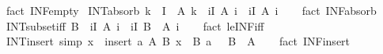 \begin{isabellebody}
\ {\isacharparenleft}{\kern0pt}fact\ INF{\isacharunderscore}{\kern0pt}empty{\isacharparenright}{\kern0pt}%
\endisatagproof
{\isafoldproof}%
%
\isadelimproof
\isanewline
%
\endisadelimproof
\isanewline
{}\isamarkupfalse%
\ INT{\isacharunderscore}{\kern0pt}absorb{\isacharcolon}{\kern0pt}\ {\isachardoublequoteopen}k\ {\isasymin}\ I\ {\isasymLongrightarrow}\ A\ k\ {\isasyminter}\ {\isacharparenleft}{\kern0pt}{\isasymInter}i{\isasymin}I{\isachardot}{\kern0pt}\ A\ i{\isacharparenright}{\kern0pt}\ {\isacharequal}{\kern0pt}\ {\isacharparenleft}{\kern0pt}{\isasymInter}i{\isasymin}I{\isachardot}{\kern0pt}\ A\ i{\isacharparenright}{\kern0pt}{\isachardoublequoteclose}\isanewline
%
\isadelimproof
\ \ %
\endisadelimproof
%
\isatagproof
{}\isamarkupfalse%
\ {\isacharparenleft}{\kern0pt}fact\ INF{\isacharunderscore}{\kern0pt}absorb{\isacharparenright}{\kern0pt}%
\endisatagproof
{\isafoldproof}%
%
\isadelimproof
\isanewline
%
\endisadelimproof
\isanewline
{}\isamarkupfalse%
\ INT{\isacharunderscore}{\kern0pt}subset{\isacharunderscore}{\kern0pt}iff{\isacharcolon}{\kern0pt}\ {\isachardoublequoteopen}B\ {\isasymsubseteq}\ {\isacharparenleft}{\kern0pt}{\isasymInter}i{\isasymin}I{\isachardot}{\kern0pt}\ A\ i{\isacharparenright}{\kern0pt}\ {\isasymlongleftrightarrow}\ {\isacharparenleft}{\kern0pt}{\isasymforall}i{\isasymin}I{\isachardot}{\kern0pt}\ B\ {\isasymsubseteq}\ A\ i{\isacharparenright}{\kern0pt}{\isachardoublequoteclose}\isanewline
%
\isadelimproof
\ \ %
\endisadelimproof
%
\isatagproof
{}\isamarkupfalse%
\ {\isacharparenleft}{\kern0pt}fact\ le{\isacharunderscore}{\kern0pt}INF{\isacharunderscore}{\kern0pt}iff{\isacharparenright}{\kern0pt}%
\endisatagproof
{\isafoldproof}%
%
\isadelimproof
\isanewline
%
\endisadelimproof
\isanewline
{}\isamarkupfalse%
\ INT{\isacharunderscore}{\kern0pt}insert\ {\isacharbrackleft}{\kern0pt}simp{\isacharbrackright}{\kern0pt}{\isacharcolon}{\kern0pt}\ {\isachardoublequoteopen}{\isacharparenleft}{\kern0pt}{\isasymInter}x\ {\isasymin}\ insert\ a\ A{\isachardot}{\kern0pt}\ B\ x{\isacharparenright}{\kern0pt}\ {\isacharequal}{\kern0pt}\ B\ a\ {\isasyminter}\ {\isasymInter}\ {\isacharparenleft}{\kern0pt}B\ {\isacharbackquote}{\kern0pt}\ A{\isacharparenright}{\kern0pt}{\isachardoublequoteclose}\isanewline
%
\isadelimproof
\ \ %
\endisadelimproof
%
\isatagproof
{}\isamarkupfalse%
\ {\isacharparenleft}{\kern0pt}fact\ INF{\isacharunderscore}{\kern0pt}insert{\isacharparenright}{\kern0pt}%
\endisatagproof
{\isafoldproof}%
%
\isadelimproof
\isanewline
%
\endisadelimproof

\end{isabellebody}

